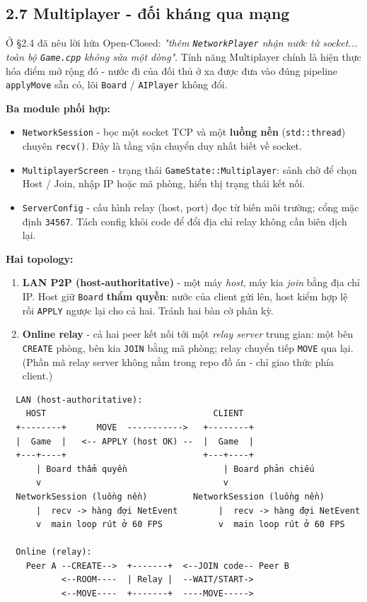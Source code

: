 \documentclass[11pt,a4paper]{article}
\begin{document}
\subsection{2.7 Multiplayer - đối kháng qua mạng}
\label{sec:mp-overview}

Ở §2.4 đã nêu lời hứa Open-Closed: \emph{"thêm \texttt{NetworkPlayer} nhận nước từ socket... toàn bộ \texttt{Game.cpp} không sửa một dòng"}. Tính năng Multiplayer chính là hiện thực hóa điểm mở rộng đó - nước đi của đối thủ ở xa được đưa vào đúng pipeline \texttt{applyMove} sẵn có, lõi \texttt{Board} / \texttt{AIPlayer} không đổi.

\textbf{Ba module phối hợp:}

\begin{itemize}
\item \texttt{NetworkSession} - bọc một socket TCP và một \textbf{luồng nền} (\texttt{std::thread}) chuyên \texttt{recv()}. Đây là tầng vận chuyển duy nhất biết về socket.
\item \texttt{MultiplayerScreen} - trạng thái \texttt{GameState::Multiplayer}: sảnh chờ để chọn Host / Join, nhập IP hoặc mã phòng, hiển thị trạng thái kết nối.
\item \texttt{ServerConfig} - cấu hình relay (host, port) đọc từ biến môi trường; cổng mặc định \texttt{34567}. Tách config khỏi code để đổi địa chỉ relay không cần biên dịch lại.
\end{itemize}

\textbf{Hai topology:}

\begin{enumerate}
\item \textbf{LAN P2P (host-authoritative)} - một máy \emph{host}, máy kia \emph{join} bằng địa chỉ IP. Host giữ \texttt{Board} \textbf{thẩm quyền}: nước của client gửi lên, host kiểm hợp lệ rồi \texttt{APPLY} ngược lại cho cả hai. Tránh hai bàn cờ phân kỳ.
\item \textbf{Online relay} - cả hai peer kết nối tới một \emph{relay server} trung gian: một bên \texttt{CREATE} phòng, bên kia \texttt{JOIN} bằng mã phòng; relay chuyển tiếp \texttt{MOVE} qua lại. (Phần mã relay server không nằm trong repo đồ án - chỉ giao thức phía client.)
\end{enumerate}

\begin{verbatim}
  LAN (host-authoritative):
    HOST                                 CLIENT
  +--------+      MOVE  ----------->   +--------+
  |  Game  |   <-- APPLY (host OK) --  |  Game  |
  +---+----+                           +---+----+
      | Board thẩm quyền                   | Board phản chiếu
      v                                    v
  NetworkSession (luồng nền)         NetworkSession (luồng nền)
      |  recv -> hàng đợi NetEvent        |  recv -> hàng đợi NetEvent
      v  main loop rút ở 60 FPS           v  main loop rút ở 60 FPS

  Online (relay):
    Peer A --CREATE-->  +-------+  <--JOIN code-- Peer B
           <--ROOM----  | Relay |  --WAIT/START->
           <--MOVE----  +-------+  ----MOVE----->
\end{verbatim}
\end{document}
